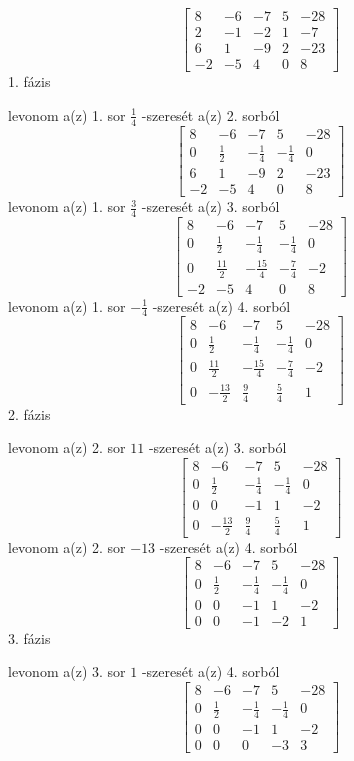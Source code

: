 \documentclass[12pt]{article}
\begin{document}
$$\left[{\begin{array}{ccccc}8& -6& -7& 5& -28\\ 2& -1& -2& 1& -7\\ 6& 1& -9& 2& -23\\ -2& -5& 4& 0& 8\end{array}}\right]$$
1. fázis

levonom a(z) 1. sor $\frac{1}{4}$ -szeresét a(z) 2. sorból
$$\left[{\begin{array}{ccccc}8& -6& -7& 5& -28\\ 0& \frac{1}{2}& -\frac{1}{4}& -\frac{1}{4}& 0\\ 6& 1& -9& 2& -23\\ -2& -5& 4& 0& 8\end{array}}\right]$$
levonom a(z) 1. sor $\frac{3}{4}$ -szeresét a(z) 3. sorból
$$\left[{\begin{array}{ccccc}8& -6& -7& 5& -28\\ 0& \frac{1}{2}& -\frac{1}{4}& -\frac{1}{4}& 0\\ 0& \frac{11}{2}& -\frac{15}{4}& -\frac{7}{4}& -2\\ -2& -5& 4& 0& 8\end{array}}\right]$$
levonom a(z) 1. sor $-\frac{1}{4}$ -szeresét a(z) 4. sorból
$$\left[{\begin{array}{ccccc}8& -6& -7& 5& -28\\ 0& \frac{1}{2}& -\frac{1}{4}& -\frac{1}{4}& 0\\ 0& \frac{11}{2}& -\frac{15}{4}& -\frac{7}{4}& -2\\ 0& -\frac{13}{2}& \frac{9}{4}& \frac{5}{4}& 1\end{array}}\right]$$
2. fázis

levonom a(z) 2. sor $11$ -szeresét a(z) 3. sorból
$$\left[{\begin{array}{ccccc}8& -6& -7& 5& -28\\ 0& \frac{1}{2}& -\frac{1}{4}& -\frac{1}{4}& 0\\ 0& 0& -1& 1& -2\\ 0& -\frac{13}{2}& \frac{9}{4}& \frac{5}{4}& 1\end{array}}\right]$$
levonom a(z) 2. sor $-13$ -szeresét a(z) 4. sorból
$$\left[{\begin{array}{ccccc}8& -6& -7& 5& -28\\ 0& \frac{1}{2}& -\frac{1}{4}& -\frac{1}{4}& 0\\ 0& 0& -1& 1& -2\\ 0& 0& -1& -2& 1\end{array}}\right]$$
3. fázis

levonom a(z) 3. sor $1$ -szeresét a(z) 4. sorból
$$\left[{\begin{array}{ccccc}8& -6& -7& 5& -28\\ 0& \frac{1}{2}& -\frac{1}{4}& -\frac{1}{4}& 0\\ 0& 0& -1& 1& -2\\ 0& 0& 0& -3& 3\end{array}}\right]$$
\end{document}
